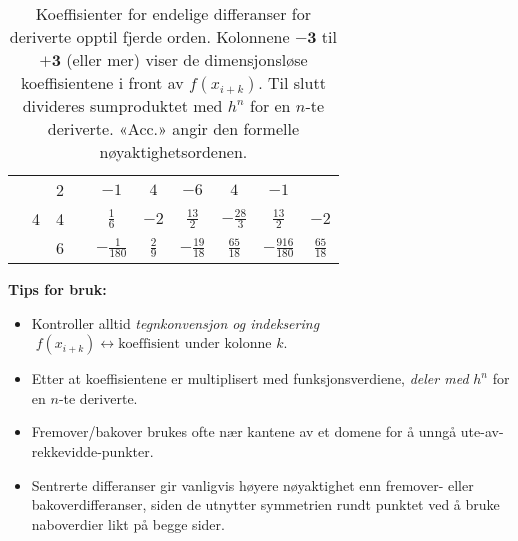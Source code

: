 \begin{table}[H]
\begin{tabular}{|c|c|c|c|c|c|c|c|c|c|}
                                                      & \multirow{3}{*}{4}           & 2                           &                  & $-1$             & $4$             & $-6$             & $4$               & $-1$               &                  \\ \cline{3-10}
                                                      &                              & 4                           &                  & $\frac{1}{6}$    & $-2$            & $\frac{13}{2}$   & $-\frac{28}{3}$   & $\frac{13}{2}$     & $-2$             \\ \cline{3-10}
                                                      &                              & 6                           &                  & $-\frac{1}{180}$ & $\frac{2}{9}$   & $-\frac{19}{18}$ & $\frac{65}{18}$   & $-\frac{916}{180}$ & $\frac{65}{18}$  \\ \hline
  \end{tabular}
  \caption{Koeffisienter for endelige differanser for deriverte opptil fjerde orden.
    Kolonnene \(\mathbf{-3}\) til \(\mathbf{+3}\) (eller mer) viser de dimensjonsløse koeffisientene i front av \(f(x_{i+k})\).
    Til slutt divideres sumproduktet med \(h^n\) for en \(n\)-te deriverte.
    «Acc.» angir den formelle nøyaktighetsordenen.}
  \label{tab:finite_difference_table}
\end{table}

\vspace{1em}

\noindent\textbf{Tips for bruk:}
\begin{itemize}
  \item Kontroller alltid \emph{tegnkonvensjon og indeksering} \(\;f(x_{i+k}) \leftrightarrow \text{koeffisient under kolonne }k\).
  \item Etter at koeffisientene er multiplisert med funksjonsverdiene, \emph{deler med} \(h^n\) for en \(n\)-te deriverte.
  \item Fremover/bakover brukes ofte nær kantene av et domene for å unngå ute-av-rekkevidde-punkter.
  \item Sentrerte differanser gir vanligvis høyere nøyaktighet enn fremover- eller bakoverdifferanser, siden de utnytter symmetrien rundt punktet ved å bruke naboverdier likt på begge sider.
\end{itemize}




